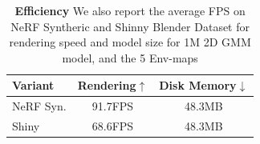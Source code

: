 \begin{table}[t]
\centering
\caption{\textbf{Efficiency} We also report the average FPS on NeRF Syntheric and Shinny Blender Dataset for rendering speed and model size for 1M 2D GMM model, and the 5 Env-maps}
\label{tab:efficieny}

\begin{tabular}{lcc}
\toprule
Variant & Rendering$\uparrow$ & Disk Memory$\downarrow$\\
\midrule
NeRF Syn.  & 91.7FPS   & 48.3MB  \\
Shiny      & 68.6FPS   & 48.3MB  \\
\bottomrule
\end{tabular}
\end{table}
